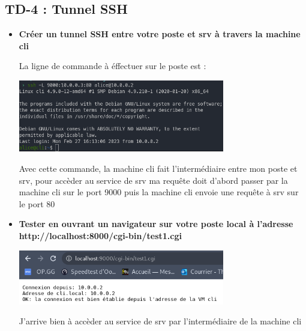 \documentclass[12pt]{article}
\begin{document}
  \subsection{TD-4 : Tunnel SSH}
  \vspace{0.3cm}

\begin{itemize}
  \item \textbf{Créer un tunnel SSH entre votre poste et srv à travers la machine cli}
  \vspace{0.3cm}

  La ligne de commande à éffectuer sur le poste est :
  \vspace{0.3cm}

  \includegraphics[width=9cm]{images/screen-ssh-td4-2.png}
  \vspace{0.3cm}

  Avec cette commande, la machine cli fait l'intermédiaire entre mon poste et srv, pour accèder au service de srv ma requête
  doit d'abord passer par la machine cli sur le port 9000 puis la machine cli envoie une requête à srv sur le port 80
\end{itemize}
\vspace{0.3cm}

\begin{itemize}
  \item \textbf{Tester en ouvrant un navigateur sur votre poste local à l'adresse
  http://localhost:8000/cgi-bin/test1.cgi}
  \vspace{0.3cm}

  \includegraphics[width=9cm]{images/screen-ssh-td4-1.png}
  \vspace{0.3cm}

  J'arrive bien à accèder au service de srv par l'intermédiaire de la machine cli
\end{itemize}
\vspace{0.3cm}
\end{document}
